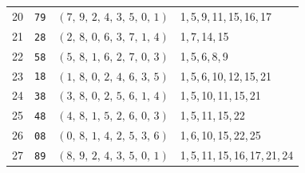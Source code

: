 \begin{longtable}{r c p{} p{}}
20 & \texttt{79} & $(7,\,9,\,2,\,4,\,3,\,5,\,0,\,1)$ & 1,\,5,\,9,\,11,\,15,\,16,\,17 \\
21 & \texttt{28} & $(2,\,8,\,0,\,6,\,3,\,7,\,1,\,4)$ & 1,\,7,\,14,\,15 \\
22 & \texttt{58} & $(5,\,8,\,1,\,6,\,2,\,7,\,0,\,3)$ & 1,\,5,\,6,\,8,\,9 \\
23 & \texttt{18} & $(1,\,8,\,0,\,2,\,4,\,6,\,3,\,5)$ & 1,\,5,\,6,\,10,\,12,\,15,\,21 \\
24 & \texttt{38} & $(3,\,8,\,0,\,2,\,5,\,6,\,1,\,4)$ & 1,\,5,\,10,\,11,\,15,\,21 \\
25 & \texttt{48} & $(4,\,8,\,1,\,5,\,2,\,6,\,0,\,3)$ & 1,\,5,\,11,\,15,\,22 \\
26 & \texttt{08} & $(0,\,8,\,1,\,4,\,2,\,5,\,3,\,6)$ & 1,\,6,\,10,\,15,\,22,\,25 \\
27 & \texttt{89} & $(8,\,9,\,2,\,4,\,3,\,5,\,0,\,1)$ & 1,\,5,\,11,\,15,\,16,\,17,\,21,\,24 \\
\end{longtable}
